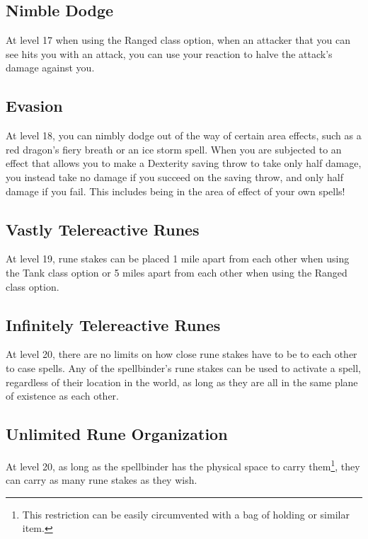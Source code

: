 \subsection{Nimble Dodge}
At level 17 when using the Ranged class option, when an attacker that you can see hits you with an attack, you can use your reaction to halve the attack's damage against you.

\subsection{Evasion}
At level 18, you can nimbly dodge out of the way of certain area effects, such as a red dragon's fiery breath or an ice storm spell. When you are subjected to an effect that allows you to make a Dexterity saving throw to take only half damage, you instead take no damage if you succeed on the saving throw, and only half damage if you fail. This includes being in the area of effect of your own spells!

\subsection{Vastly Telereactive Runes}
At level 19, rune stakes can be placed 1 mile apart from each other when using the Tank class option or 5 miles apart from each other when using the Ranged class option.

\subsection{Infinitely Telereactive Runes}
At level 20, there are no limits on how close rune stakes have to be to each other to case spells. Any of the spellbinder's rune stakes can be used to activate a spell, regardless of their location in the world, as long as they are all in the same plane of existence as each other.

\subsection{Unlimited Rune Organization}
At level 20, as long as the spellbinder has the physical space to carry them\footnote{This restriction can be easily circumvented with a bag of holding or similar item.}, they can carry as many rune stakes as they wish.

